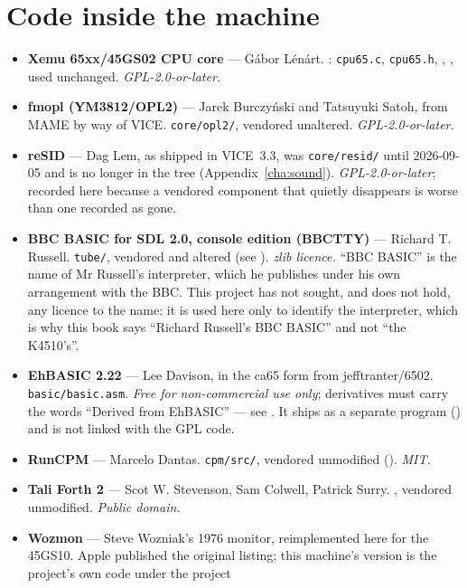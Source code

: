 \section{Code inside the machine}
\begin{itemize}[leftmargin=1.4em]
\item \textbf{Xemu 65xx/45GS02 CPU core} --- Gábor Lénárt.
  : \verb|cpu65.c|, \verb|cpu65.h|,
  , ,
  used unchanged. \emph{GPL-2.0-or-later.}
\item \textbf{fmopl (YM3812/OPL2)} --- Jarek Burczyński and Tatsuyuki
  Satoh, from MAME by way of VICE. \verb|core/opl2/|, vendored
  unaltered. \emph{GPL-2.0-or-later.}
\item \textbf{reSID} --- Dag Lem, as shipped in VICE~3.3, was
  \verb|core/resid/| until 2026-09-05 and is no longer in the tree
  (Appendix~\ref{cha:sound}). \emph{GPL-2.0-or-later}; recorded here
  because a vendored component that quietly disappears is worse than one
  recorded as gone.
\item \textbf{BBC BASIC for SDL 2.0, console edition (BBCTTY)} ---
  Richard T. Russell. \verb|tube/|, vendored and altered (see
  ). \emph{zlib licence.} ``BBC BASIC'' is the
  name of Mr Russell's interpreter, which he publishes under his own
  arrangement with the BBC. This project has not sought, and does not
  hold, any licence to the name: it is used here only to identify the
  interpreter, which is why this book says ``Richard Russell's BBC
  BASIC'' and not ``the K4510's''.
\item \textbf{EhBASIC 2.22} --- Lee Davison, in the ca65 form from
  jefftranter/6502. \verb|basic/basic.asm|. \emph{Free for
  non-commercial use only}; derivatives must carry the words
  ``Derived from EhBASIC'' --- see .
  It ships as a separate program
  () and is not linked with the GPL
  code.
\item \textbf{RunCPM} --- Marcelo Dantas. \verb|cpm/src/|, vendored
  unmodified (). \emph{MIT.}
\item \textbf{Tali Forth 2} --- Scot W. Stevenson, Sam Colwell,
  Patrick Surry. , vendored unmodified.
  \emph{Public domain.}
\item \textbf{Wozmon} --- Steve Wozniak's 1976 monitor, reimplemented
  here for the 45GS10. Apple published the original listing; this
  machine's version is the project's own code under the project

\end{itemize}
